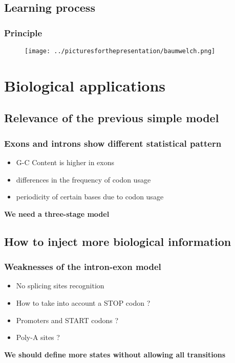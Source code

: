 \documentclass{beamer}
\begin{document}
\subsection{Learning process}

\begin{frame}
\frametitle{Principle}
\begin{figure}[h]
\texttt{[image: ../picturesforthepresentation/baumwelch.png]}
\end{figure}

\end{frame}

\section{Biological applications}
\subsection{Relevance of the previous simple model}

\begin{frame}
\frametitle{Exons and introns show different statistical pattern}
\begin{itemize}
	\item G-C Content is higher in exons
	\item differences in the frequency of codon usage
	\item periodicity of certain bases due to codon usage
\end{itemize}
		
	\vspace{0.5cm}
	
	\pause\begin{center}
		\textbf{We need a three-stage model }
	\end{center}
\end{frame}

\subsection{How to inject more biological information}
\begin{frame}
\frametitle{Weaknesses of the intron-exon model}
	\begin{itemize}
		\item No splicing sites recognition 
		\item How to take into account a STOP codon ? 
		\item Promoters and START codons ? 
		\item Poly-A sites ?
	\end{itemize}
	
	\vspace{0.5cm}
	
	\pause\begin{center}
		\textbf{We should define more states without allowing all transitions}
	\end{center}
	
\end{frame}
\end{document}

